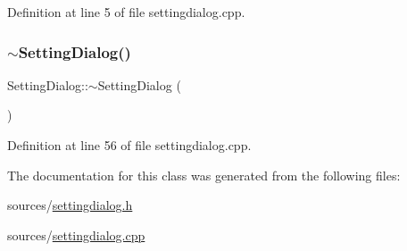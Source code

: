 Definition at line 5 of file settingdialog.\+cpp.

\mbox{\label{class_setting_dialog_a9bfa278550d23df3f5e944989b0b0f54}} 
\subsubsection{\texorpdfstring{$\sim$\+Setting\+Dialog()}{~SettingDialog()}}
{\footnotesize\ttfamily Setting\+Dialog\+::$\sim$\+Setting\+Dialog (\begin{DoxyParamCaption}{ }\end{DoxyParamCaption})}



Definition at line 56 of file settingdialog.\+cpp.



The documentation for this class was generated from the following files\+:\begin{DoxyCompactItemize}
\item 
sources/\mbox{\hyperlink{settingdialog_8h}{settingdialog.\+h}}\item 
sources/\mbox{\hyperlink{settingdialog_8cpp}{settingdialog.\+cpp}}\end{DoxyCompactItemize}

